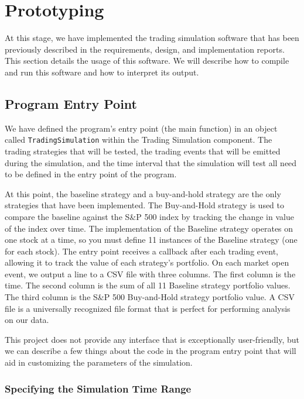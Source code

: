 
\section{Prototyping}

At this stage, we have implemented the trading simulation software that has been previously described in the requirements, design, and implementation reports.
This section details the usage of this software.
We will describe how to compile and run this software and how to interpret its output.

\subsection{Program Entry Point}

We have defined the program's entry point (the main function) in an object called \texttt{TradingSimulation} within the Trading Simulation component.
The trading strategies that will be tested, the trading events that will be emitted during the simulation, and the time interval that the simulation will test all need to be defined in the entry point of the program.

At this point, the baseline strategy and a buy-and-hold strategy are the only strategies that have been implemented.
The Buy-and-Hold strategy is used to compare the baseline against the S\&P 500 index by tracking the change in value of the index over time.
The implementation of the Baseline strategy operates on one stock at a time, so you must define 11 instances of the Baseline strategy (one for each stock).
The entry point receives a callback after each trading event, allowing it to track the value of each strategy's portfolio.
On each market open event, we output a line to a CSV file with three columns.
The first column is the time.
The second column is the sum of all 11 Baseline strategy portfolio values.
The third column is the S\&P 500 Buy-and-Hold strategy portfolio value.
A CSV file is a universally recognized file format that is perfect for performing analysis on our data.

This project does not provide any interface that is exceptionally user-friendly, but we can describe a few things about the code in the program entry point that will aid in customizing the parameters of the simulation.

\subsubsection{Specifying the Simulation Time Range}


